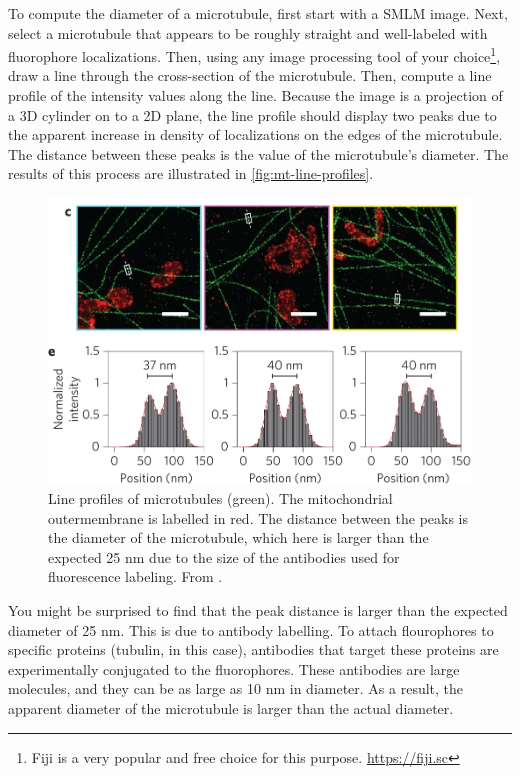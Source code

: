 \documentclass[10pt,a4paper,oneside]{book}
\begin{document}
To compute the diameter of a microtubule, first start with a SMLM image. Next, select a microtubule that appears to be roughly straight and well-labeled with fluorophore localizations. Then, using any image processing tool of your choice\footnote{Fiji is a very popular and free choice for this purpose. \url{https://fiji.sc}}, draw a line through the cross-section of the microtubule. Then, compute a line profile of the intensity values along the line. Because the image is a projection of a 3D cylinder on to a 2D plane, the line profile should display two peaks due to the apparent increase in density of localizations on the edges of the microtubule. The distance between these peaks is the value of the microtubule's diameter. The results of this process are illustrated in \autoref{fig:mt-line-profiles}.

\begin{figure}[ht]
    \centering
    \includegraphics[width=1.0\textwidth]{mt-line-profiles.png}
    \caption{Line profiles of microtubules (green). The mitochondrial outermembrane is labelled in red. The distance between the peaks is the diameter of the microtubule, which here is larger than the expected 25 nm due to the size of the antibodies used for fluorescence labeling. From \cite{douglass-naturephotonics-2016}.}
    \label{fig:mt-line-profiles}
\end{figure}

You might be surprised to find that the peak distance is larger than the expected diameter of 25 nm. This is due to antibody labelling. To attach flourophores to specific proteins (tubulin, in this case), antibodies that target these proteins are experimentally conjugated to the fluorophores. These antibodies are large molecules, and they can be as large as 10 nm in diameter. As a result, the apparent diameter of the microtubule is larger than the actual diameter.
\end{document}

